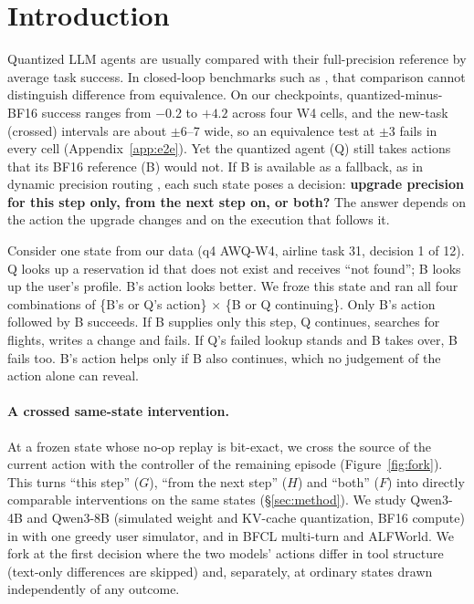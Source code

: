\section{Introduction}
\label{sec:intro}

Quantized LLM agents are usually compared with their full-precision reference by average task success. In closed-loop benchmarks such as \tautwo{} \citep{barres2025tau2}, that comparison cannot distinguish difference from equivalence. On our checkpoints, quantized-minus-BF16 success ranges from $-0.2$ to $+4.2$\pp{} across four W4 cells, and the new-task (crossed) intervals are about $\pm$6--7\pp{} wide, so an equivalence test at $\pm$3\pp{} fails in every cell (Appendix~\ref{app:e2e}). %
Yet the quantized agent (Q) still takes actions that its BF16 reference (B) would not. If B is available as a fallback, as in dynamic precision routing \citep{li2026dynamicmp}, each such state poses a decision: \textbf{upgrade precision for this step only, from the next step on, or both?} The answer depends on the action the upgrade changes and on the execution that follows it.

Consider one state from our data (q4 AWQ-W4, \tautwo{} airline task 31, decision 1 of 12). Q looks up a reservation id that does not exist and receives ``not found''; B looks up the user's profile. B's action looks better. We froze this state and ran all four combinations of \{B's or Q's action\} $\times$ \{B or Q continuing\}. Only B's action followed by B succeeds. If B supplies only this step, Q continues, searches for flights, writes a change and fails. If Q's failed lookup stands and B takes over, B fails too. %
B's action helps only if B also continues, which no judgement of the action alone can reveal.

\paragraph{A crossed same-state intervention.} At a frozen state whose no-op replay is bit-exact, we cross the source of the current action with the controller of the remaining episode (Figure~\ref{fig:fork}). This turns ``this step'' ($G$), ``from the next step'' ($H$) and ``both'' ($F$) into directly comparable interventions on the same states (\S\ref{sec:method}). We study Qwen3-4B and Qwen3-8B (simulated weight and KV-cache quantization, BF16 compute) in \tautwo{} with one greedy user simulator, and in BFCL multi-turn and ALFWorld. We fork at the first decision where the two models' actions differ in tool structure (text-only differences are skipped) and, separately, at ordinary states drawn independently of any outcome. %

